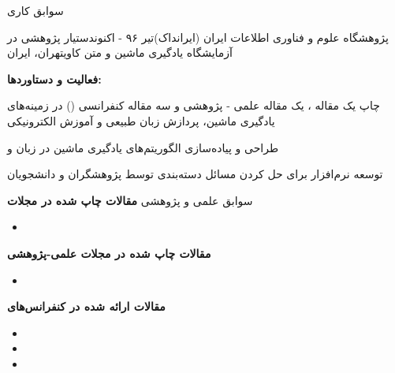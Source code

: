 \documentclass{resume} %
\begin{document}
\begin{rSection}{سوابق‌ کاری}
\def\jobtitle{دستیار پژوهشی در آزمایشگاه یادگیری ماشین و متن کاوی}
\def\employername{پژوهشگاه علوم و فناوری اطلاعات ایران (ایرانداک)}
\def\years{تیر ۹۶ - اکنون}
\def\location{تهران، ایران}

\begin{rSubsection}{\employername}{\years}{\jobtitle}{\location}

\textbf{فعالیت و دستاوردها:}
\item چاپ یک مقاله ، یک مقاله علمی - پژوهشی و سه مقاله کنفرانسی () در زمینه‌های یادگیری ماشین، پردازش زبان طبیعی و آموزش الکترونیکی
\item طراحی و پیاده‌سازی الگوریتم‌های یادگیری ماشین در زبان  و 
\item توسعه نرم‌افزار  برای حل کردن مسائل دسته‌بندی توسط پژوهشگران و دانشجویان

\end{rSubsection}

%
\end{rSection}
%
\begin{rSection}{سوابق علمی و پژوهشی}
\small\textbf{مقالات چاپ شده در مجلات }
\begin{latin}
\begin{itemize}
	\item {}
\end{itemize}
\end{latin}

\small\textbf{مقالات چاپ شده در مجلات علمی-پژوهشی}
\begin{itemize}
	\item {}
\end{itemize}

\small\textbf{مقالات ارائه شده در کنفرانس‌های }
\begin{itemize}
	\item {}
	\item {}
	\item {}
\end{itemize}
\end{rSection}
\end{document}
